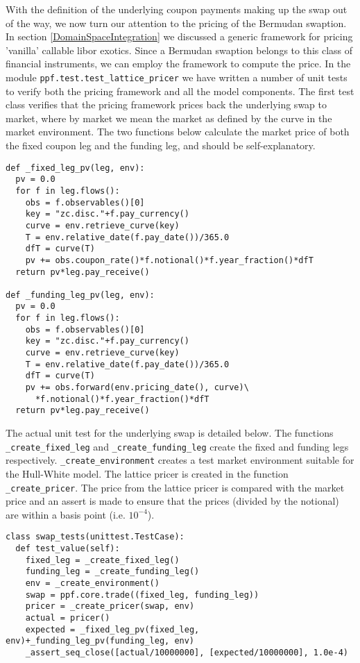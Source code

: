 With the definition of the underlying coupon payments making up the swap out of the way, we now turn our attention to the pricing of 
the Bermudan swaption. In section \ref{DomainSpaceIntegration} we discussed a generic framework for pricing 'vanilla' callable libor exotics. Since a 
Bermudan swaption belongs to this class of financial instruments, we can employ the framework to compute the price. In the module \verb|ppf.test.test_lattice_pricer| we have 
written a number of unit tests to verify both the pricing framework and all the model components. The first test class verifies that the pricing framework prices back the 
underlying swap to market, where by market we mean the market as defined by the curve in the market environment. The two functions below calculate the market price of 
both the fixed coupon leg and the funding leg, and should be self-explanatory.

\begin{verbatim}
def _fixed_leg_pv(leg, env):
  pv = 0.0
  for f in leg.flows():
    obs = f.observables()[0]
    key = "zc.disc."+f.pay_currency()
    curve = env.retrieve_curve(key)
    T = env.relative_date(f.pay_date())/365.0
    dfT = curve(T)
    pv += obs.coupon_rate()*f.notional()*f.year_fraction()*dfT
  return pv*leg.pay_receive()

def _funding_leg_pv(leg, env):
  pv = 0.0
  for f in leg.flows():
    obs = f.observables()[0]
    key = "zc.disc."+f.pay_currency()
    curve = env.retrieve_curve(key)
    T = env.relative_date(f.pay_date())/365.0
    dfT = curve(T)
    pv += obs.forward(env.pricing_date(), curve)\
      *f.notional()*f.year_fraction()*dfT
  return pv*leg.pay_receive()
\end{verbatim}

The actual unit test for the underlying swap is detailed below. The functions \verb|_create_fixed_leg| and \verb|_create_funding_leg| create the fixed and funding legs respectively. \verb|_create_environment| creates a test market environment suitable for the Hull-White model. The lattice pricer is created in the function \verb|_create_pricer|. The price from the lattice pricer is compared with the market price and an assert is made to ensure that the prices (divided by the notional) are within a basis point (i.e. $10^{-4}$).

\begin{verbatim}
class swap_tests(unittest.TestCase):
  def test_value(self):
    fixed_leg = _create_fixed_leg()
    funding_leg = _create_funding_leg()
    env = _create_environment() 
    swap = ppf.core.trade((fixed_leg, funding_leg))   
    pricer = _create_pricer(swap, env)
    actual = pricer()
    expected = _fixed_leg_pv(fixed_leg, env)+_funding_leg_pv(funding_leg, env)
    _assert_seq_close([actual/10000000], [expected/10000000], 1.0e-4)
\end{verbatim}

